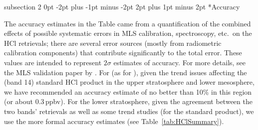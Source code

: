\documentclass[11pt,draft]{report}
\makeatletter
\renewcommand{\subsection}{\@startsection%
  {subsection}%
  {2}%
  {0pt}%
  {-2pt plus -1pt minus -2pt}%
  {2pt plus 1pt minus 2pt}%
  {\large\sffamily\fontseries{sb}\selectfont\flushleft\color{SectionColor}\figureversion{tabular}}}%
\makeatother
\begin{document}
\subsection*{Accuracy}

The accuracy estimates in the Table came from a quantification of the
combined effects of possible systematic errors in MLS calibration,
spectroscopy, etc.\ on the HCl retrievals; there are several error
sources (mostly from radiometric calibration components) that contribute
significantly to the total error.  These values are intended to
represent $2\sigma$ estimates of accuracy.  For more details, see the
MLS validation paper by \citet{FroidevauxEtal08HCl}.  For \thisv (as for
\prevv), given the trend issues affecting the (band 14) standard HCl
product in the upper stratosphere and lower mesosphere, we have
recommended an accuracy estimate of no better than 10\% in this region
(or about 0.3\,ppbv).  For the lower stratosphere, given the agreement
between the two bands' retrievals as well as some trend studies (for the
standard product), we use the more formal accuracy estimates (see
Table~\ref{tab:HClSummary}).
\end{document}
